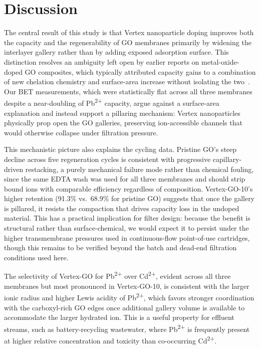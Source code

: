 \section{Discussion}

The central result of this study is that Vertex nanoparticle doping improves both the capacity and the regenerability of GO membranes primarily by widening the interlayer gallery rather than by adding exposed adsorption surface. This distinction resolves an ambiguity left open by earlier reports on metal-oxide-doped GO composites, which typically attributed capacity gains to a combination of new chelation chemistry and surface-area increase without isolating the two~\cite{Calder2020}. Our BET measurements, which were statistically flat across all three membranes despite a near-doubling of Pb\textsuperscript{2+} capacity, argue against a surface-area explanation and instead support a pillaring mechanism: Vertex nanoparticles physically prop open the GO galleries, preserving ion-accessible channels that would otherwise collapse under filtration pressure.

This mechanistic picture also explains the cycling data. Pristine GO's steep decline across five regeneration cycles is consistent with progressive capillary-driven restacking, a purely mechanical failure mode rather than chemical fouling, since the same EDTA wash was used for all three membranes and should strip bound ions with comparable efficiency regardless of composition. Vertex-GO-10's higher retention (91.3\% vs.\ 68.9\% for pristine GO) suggests that once the gallery is pillared, it resists the compaction that drives capacity loss in the undoped material. This has a practical implication for filter design: because the benefit is structural rather than surface-chemical, we would expect it to persist under the higher transmembrane pressures used in continuous-flow point-of-use cartridges, though this remains to be verified beyond the batch and dead-end filtration conditions used here.

The selectivity of Vertex-GO for Pb\textsuperscript{2+} over Cd\textsuperscript{2+}, evident across all three membranes but most pronounced in Vertex-GO-10, is consistent with the larger ionic radius and higher Lewis acidity of Pb\textsuperscript{2+}, which favors stronger coordination with the carboxyl-rich GO edges once additional gallery volume is available to accommodate the larger hydrated ion. This is a useful property for effluent streams, such as battery-recycling wastewater, where Pb\textsuperscript{2+} is frequently present at higher relative concentration and toxicity than co-occurring Cd\textsuperscript{2+}.

